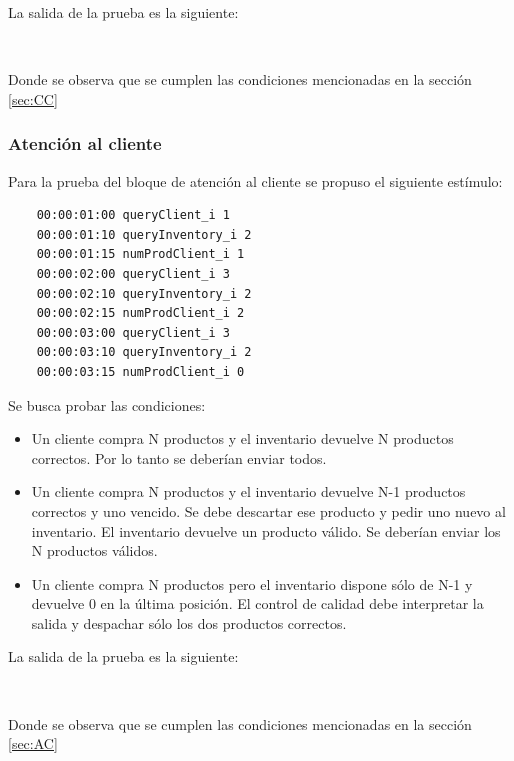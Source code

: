 \documentclass[10pt]{article}
\begin{document}
La salida de la prueba es la siguiente:

\begin{minipage}{1\textwidth}
	\centering
	\begin{lstlisting}
	
	\end{lstlisting}
	
\end{minipage}
Donde se observa que se cumplen las condiciones mencionadas en la sección \ref{sec:CC}

\subsubsection{Atención al cliente}
Para la prueba del bloque de atención al cliente se propuso el siguiente estímulo:

\begin{minipage}{1\textwidth}
	\centering
	\begin{lstlisting}
	00:00:01:00	queryClient_i 1
	00:00:01:10 queryInventory_i 2
	00:00:01:15 numProdClient_i 1
	00:00:02:00	queryClient_i 3
	00:00:02:10 queryInventory_i 2
	00:00:02:15 numProdClient_i 2
	00:00:03:00	queryClient_i 3
	00:00:03:10 queryInventory_i 2
	00:00:03:15 numProdClient_i 0
	\end{lstlisting}
	
\end{minipage}

Se busca probar las condiciones:
\begin{itemize}
	\item Un cliente compra N productos y el inventario devuelve N productos correctos. Por lo tanto se deberían enviar todos.
	\item Un cliente compra N productos y el inventario devuelve N-1 productos correctos y uno vencido. Se debe descartar ese producto y pedir uno nuevo al inventario. El inventario devuelve un producto válido. Se deberían enviar los N productos válidos.
	\item Un cliente compra N productos pero el inventario dispone sólo de N-1 y devuelve 0 en la última posición. El control de calidad debe interpretar la salida y despachar sólo los dos productos correctos.
\end{itemize}

La salida de la prueba es la siguiente:

\begin{minipage}{1\textwidth}
	\centering
	\begin{lstlisting}
	
	\end{lstlisting}
	
\end{minipage}
Donde se observa que se cumplen las condiciones mencionadas en la sección \ref{sec:AC}
\end{document}
